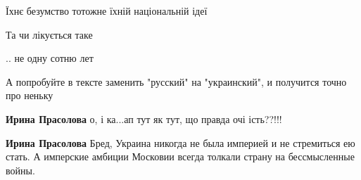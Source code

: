 \begin{itemize}
 


 

Їхнє безумство тотожне їхній національній ідеї

Та чи лікується таке

 
.. не одну сотню лет


А попробуйте в тексте заменить "русский" на "украинский", и получится точно про неньку

\begin{itemize}
 
\textbf{Ирина Прасолова} о, і ка...ап тут як тут, що правда очі ість??!!!

 
\textbf{Ирина Прасолова} Бред, Украина никогда не была империей и не стремиться
ею стать. А имперские амбиции Московии всегда толкали страну на бессмысленные
войны.

 

\end{itemize}
\end{itemize}

